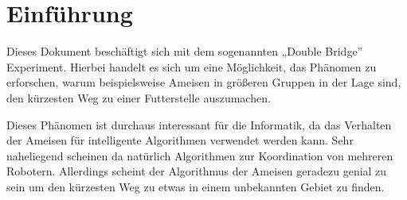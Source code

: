 
\section{Einführung}

Dieses Dokument beschäftigt sich mit dem sogenannten „Double Bridge”
Experiment. Hierbei handelt es sich um eine Möglichkeit, das Phänomen
zu erforschen, warum beispielsweise Ameisen in größeren Gruppen in der
Lage sind, den kürzesten Weg zu einer Futterstelle auszumachen.

Dieses Phänomen ist durchaus interessant für die Informatik, da das
Verhalten der Ameisen für intelligente Algorithmen verwendet werden
kann. Sehr naheliegend scheinen da natürlich Algorithmen zur
Koordination von mehreren Robotern. Allerdings scheint der Algorithmus
der Ameisen geradezu genial zu sein um den kürzesten Weg zu etwas in einem
unbekannten Gebiet zu finden.